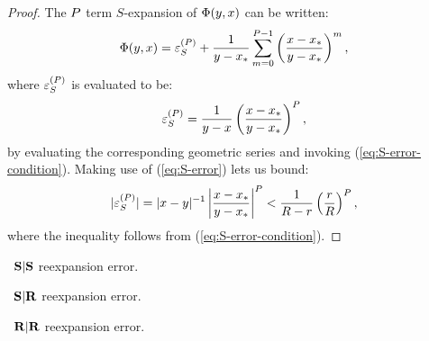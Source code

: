 \begin{proof}
  The $P$ term $S$-expansion of $\Phi(y, x)$ can be
  written:
  \begin{align}
    \label{eq:S-expansion}
    \Phi(y, x) = {\varepsilon}^{(P)}_{S} + \frac{1}{y - {x}_{*}} \sum_{m=0}^{P-1} \left(\frac{x - {x}_{*}}{y - {x}_{*}}\right)^m,
  \end{align}
  where ${\varepsilon}^{(P)}_{S}$ is evaluated to be:
  \begin{align}
    \label{eq:S-error}
    {\varepsilon}^{(P)}_{S} = \frac{1}{y - x} \left(\frac{x - {x}_{*}}{y - {x}_{*}}\right)^P,
  \end{align}
  by evaluating the corresponding geometric series and invoking
  (\ref{eq:S-error-condition}). Making use of (\ref{eq:S-error}) lets
  us bound:
  \begin{align}
    \label{eq:S-error-bound}
    |{\varepsilon}^{(P)}_{S}| = |x - y|^{-1} \left|\frac{x - {x}_{*}}{y - {x}_{*}}\right|^P < \frac{1}{R - r} \left(\frac{r}{R}\right)^P,
  \end{align}
  where the inequality follows from (\ref{eq:S-error-condition}).
\end{proof}

\begin{lemma}\label{lemma:SS-error}
  \TODO\ $\bold{S}|\bold{S}$ reexpansion error.
\end{lemma}

\begin{lemma}\label{lemma:SR-error}
  \TODO\ $\bold{S}|\bold{R}$ reexpansion error.
\end{lemma}

\begin{lemma}\label{lemma:RR-error}
  \TODO\ $\bold{R}|\bold{R}$ reexpansion error.
\end{lemma}

